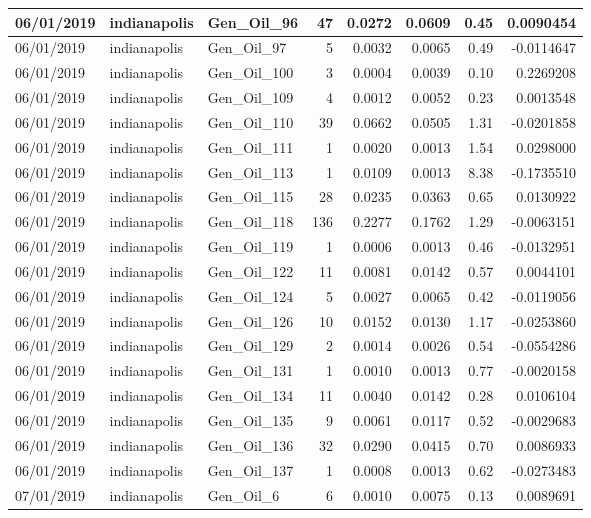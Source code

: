 \documentclass[
  letterpaper,
  DIV=11,
  numbers=noendperiod]{scrartcl}
\begin{document}
\begin{tabular}{l|l|l|r|r|r|r|r}
\hline
06/01/2019 & indianapolis & Gen\_Oil\_96 & 47 & 0.0272 & 0.0609 & 0.45 & 0.0090454\\
\hline
06/01/2019 & indianapolis & Gen\_Oil\_97 & 5 & 0.0032 & 0.0065 & 0.49 & -0.0114647\\
\hline
06/01/2019 & indianapolis & Gen\_Oil\_100 & 3 & 0.0004 & 0.0039 & 0.10 & 0.2269208\\
\hline
06/01/2019 & indianapolis & Gen\_Oil\_109 & 4 & 0.0012 & 0.0052 & 0.23 & 0.0013548\\
\hline
06/01/2019 & indianapolis & Gen\_Oil\_110 & 39 & 0.0662 & 0.0505 & 1.31 & -0.0201858\\
\hline
06/01/2019 & indianapolis & Gen\_Oil\_111 & 1 & 0.0020 & 0.0013 & 1.54 & 0.0298000\\
\hline
06/01/2019 & indianapolis & Gen\_Oil\_113 & 1 & 0.0109 & 0.0013 & 8.38 & -0.1735510\\
\hline
06/01/2019 & indianapolis & Gen\_Oil\_115 & 28 & 0.0235 & 0.0363 & 0.65 & 0.0130922\\
\hline
06/01/2019 & indianapolis & Gen\_Oil\_118 & 136 & 0.2277 & 0.1762 & 1.29 & -0.0063151\\
\hline
06/01/2019 & indianapolis & Gen\_Oil\_119 & 1 & 0.0006 & 0.0013 & 0.46 & -0.0132951\\
\hline
06/01/2019 & indianapolis & Gen\_Oil\_122 & 11 & 0.0081 & 0.0142 & 0.57 & 0.0044101\\
\hline
06/01/2019 & indianapolis & Gen\_Oil\_124 & 5 & 0.0027 & 0.0065 & 0.42 & -0.0119056\\
\hline
06/01/2019 & indianapolis & Gen\_Oil\_126 & 10 & 0.0152 & 0.0130 & 1.17 & -0.0253860\\
\hline
06/01/2019 & indianapolis & Gen\_Oil\_129 & 2 & 0.0014 & 0.0026 & 0.54 & -0.0554286\\
\hline
06/01/2019 & indianapolis & Gen\_Oil\_131 & 1 & 0.0010 & 0.0013 & 0.77 & -0.0020158\\
\hline
06/01/2019 & indianapolis & Gen\_Oil\_134 & 11 & 0.0040 & 0.0142 & 0.28 & 0.0106104\\
\hline
06/01/2019 & indianapolis & Gen\_Oil\_135 & 9 & 0.0061 & 0.0117 & 0.52 & -0.0029683\\
\hline
06/01/2019 & indianapolis & Gen\_Oil\_136 & 32 & 0.0290 & 0.0415 & 0.70 & 0.0086933\\
\hline
06/01/2019 & indianapolis & Gen\_Oil\_137 & 1 & 0.0008 & 0.0013 & 0.62 & -0.0273483\\
\hline
07/01/2019 & indianapolis & Gen\_Oil\_6 & 6 & 0.0010 & 0.0075 & 0.13 & 0.0089691\\

\end{tabular}
\end{document}
